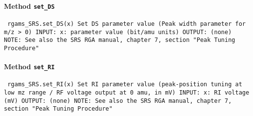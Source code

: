 \paragraph{Method \texttt{set_DS}}
\vspace{1ex}
\texttt{\newline
rgams_SRS.set_DS(x)\newline
\newline
Set DS parameter value (Peak width parameter for m/z > 0)\newline
\newline
INPUT:\newline
x: parameter value (bit/amu units)\newline
\newline
OUTPUT:\newline
(none)\newline
\newline
NOTE:\newline
See also the SRS RGA manual, chapter 7, section "Peak Tuning Procedure"\newline
\newline
}

\paragraph{Method \texttt{set_RI}}
\vspace{1ex}
\texttt{\newline
rgams_SRS.set_RI(x)\newline
\newline
Set RI parameter value (peak-position tuning at low mz range / RF voltage output at 0 amu, in mV)\newline
\newline
INPUT:\newline
x: RI voltage (mV)\newline
\newline
OUTPUT:\newline
(none)\newline
\newline
NOTE:\newline
See also the SRS RGA manual, chapter 7, section "Peak Tuning Procedure"\newline
\newline
}

